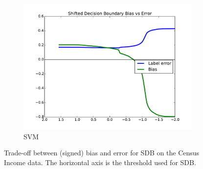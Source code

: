 \documentclass[twoside,leqno,twocolumn]{article}
\begin{document}
\begin{figure}[t]
\begin{subfigure}{.7\columnwidth}
\includegraphics[width=\columnwidth]{images/adult-svm-T.pdf}%
\caption{SVM}%
\label{fig:adult_svm_tradeoff}%
\end{subfigure}%
\caption{Trade-off between (signed) bias and error for SDB on the Census Income data. The horizontal axis is the threshold used for SDB.}
\label{fig:adult_tradeoffs}
\end{figure}
\end{document}
